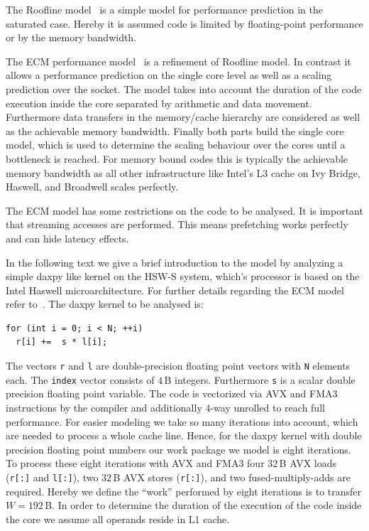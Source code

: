 {The Roofline model~\cite{williams-2009} is a simple model
for performance prediction in the saturated case.
Hereby it is assumed code is limited by floating-point performance or by the
memory bandwidth.

The ECM performance model~\cite{treibig-2010-ecm,hager-2012-ecm} is a refinement
of Roofline model. 
In contrast it allows a performance prediction on the single core level as well
as a scaling prediction over the socket.
The model takes into account the duration of the code execution inside the core
separated by arithmetic and data movement.
Furthermore data transfers in the memory/cache hierarchy are considered as well
as the achievable memory bandwidth.
%
Finally both parts build the single core model, which is used to determine the
scaling behaviour over the cores until a bottleneck is reached. 
%
For memory bound codes this is typically the achievable memory bandwidth as all
other infrastructure like Intel's L3 cache on Ivy Bridge, Haswell, and Broadwell
scales perfectly. 

The ECM model has some restrictions on the code to be analysed.
It is important that streaming accesses are performed. This means prefetching
works perfectly and can hide latency effects.

In the following text we give a brief introduction to the model by analyzing a
simple daxpy like kernel on the HSW-S system, which's processor is based on the Intel Haswell
microarchitecture. For further details regarding the ECM model refer
to~\cite{stengel-2015}.  The daxpy kernel to be analysed is:
%
\begin{lstlisting}
for (int i = 0; i < N; ++i) 
  r[i] +=  s * l[i];
\end{lstlisting}
%
The vectors \verb'r' and \verb'l' are double-precision floating point vectors
with \verb'N' elements each. 
The \verb'index' vector consists of $4$\,B integers.
Furthermore \verb's' is a scalar double precision floating point variable.
%
The code is vectorized via AVX and FMA3 instructions by the compiler and
additionally $4$-way unrolled to reach full performance.
%
For easier modeling we take so many iterations into account, which are needed to
process a whole cache line.
Hence, for the daxpy kernel with double precision floating point numbers our
work package we model is eight iterations.
%
To process these eight iterations with AVX and FMA3 four $32$\,B AVX loads (\verb|r[:]| and
\verb|l[:]|), two
$32$\,B AVX stores (\verb'r[:]'), and two fused-multiply-adds are required.
%
Hereby we define the ``work'' performed by eight iterations is to transfer $W = 192$\,B.
%
In order to determine the duration of the execution of the code inside
the core we assume all operands reside in L1 cache.

}
